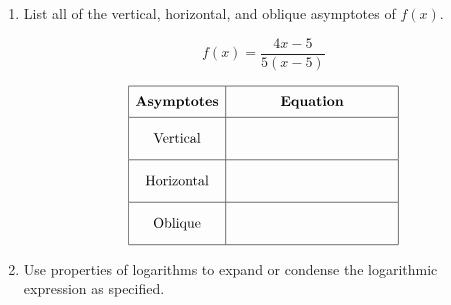 \documentclass[11pt]{article}
\begin{document}
\begin{enumerate}
\newpage

% 

\item %
\providecommand{\stxKnowl}{}\renewcommand{\stxKnowl}[1]{#1}
\providecommand{\stxOuttro}{}\renewcommand{\stxOuttro}[1]{#1}
\providecommand{\stxTitle}{}\renewcommand{\stxTitle}[1]{#1}
\renewcommand{\stxOuttro}[1]{}
\stxKnowl{
List all of the vertical, horizontal, and oblique asymptotes of \(f(x)\).

\[f(x) = \displaystyle{\frac{4x - 5}{5(x - 5)}}\]

 \[\begin{array}{|c|c|} \hline \rule[-0.8em]{0pt}{2.2em} \textbf{Asymptotes} & \textbf{Equation} \\ \hline \rule[-1.2em]{0pt}{3em} \text{Vertical} & \text{\hspace{4cm}} \\ \hline \rule[-1.2em]{0pt}{3em} \text{Horizontal} & \text{\hspace{4cm}} \\ \hline \rule[-1.2em]{0pt}{3em} \text{Oblique} & \text{\hspace{4cm}} \\ \hline \end{array}\] 

\stxOuttro{
Solution

 \[\begin{array}{|c|c|} \hline \rule[-0.8em]{0pt}{2.2em} \textbf{Asymptotes} & \textbf{Equation} \\ \hline \rule[-1.2em]{0pt}{3em} \text{Vertical} & x = 5 \\ \hline \rule[-1.2em]{0pt}{3em} \text{Horizontal} & y = \frac{4}{5} \\ \hline \rule[-1.2em]{0pt}{3em} \text{Oblique} & \text{none} \\ \hline \end{array}\] 

}
}

\newpage

% 

\item %
\providecommand{\stxKnowl}{}\renewcommand{\stxKnowl}[1]{#1}
\providecommand{\stxOuttro}{}\renewcommand{\stxOuttro}[1]{#1}
\providecommand{\stxTitle}{}\renewcommand{\stxTitle}[1]{#1}
\renewcommand{\stxOuttro}[1]{}
\stxKnowl{
Use properties of logarithms to expand or condense the logarithmic expression as specified.

}
\end{enumerate}
\end{document}
